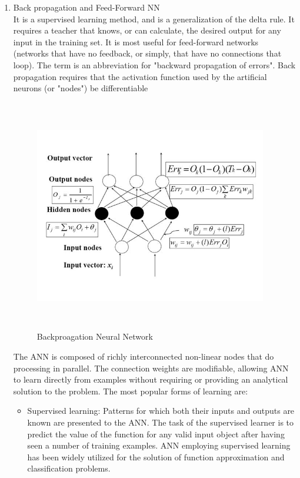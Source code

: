 \documentclass[a4paper,14pt,onecolumn]{article}
\begin{document}
\begin{enumerate}
\item Back propagation and Feed-Forward NN\\
       It is a supervised learning method, and is a generalization of the delta rule. It requires a teacher that knows, or can calculate, the desired output for any input in the training set. It is most useful for feed-forward networks (networks that have no feedback, or simply, that have no connections that loop). The term is an abbreviation for "backward propagation of errors". Back propagation requires that the activation function used by the artificial neurons (or "nodes") be differentiable

\begin{figure}[hbp]
\begin{center}
\includegraphics[height=4in,width=4in]
{BBNeuralnetwork.jpg}  
\caption{Backproagation Neural Network}
\end{center}
\end{figure} 

The ANN is composed of richly interconnected non-linear nodes that do processing in parallel. The connection weights are modifiable, allowing ANN to learn directly from examples without requiring or providing an analytical solution to the problem. The most popular forms of learning are:

\begin{itemize}

\item Supervised learning: Patterns for which both their inputs and outputs are known are presented to the ANN. The task of the supervised learner is to predict the value of the function for any valid input object after having seen a number of training examples. ANN employing supervised learning has been widely utilized for the solution of function approximation and classification problems.  


\end{itemize}
\end{enumerate}
\end{document}
